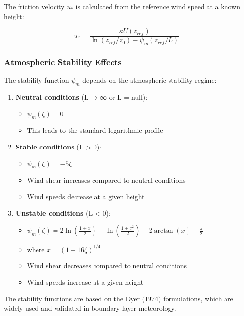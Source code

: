 \documentclass{article}
\begin{document}
The friction velocity \(u_*\) is calculated from the reference wind
speed at a known height:

\[u_* = \frac{\kappa U(z_{ref})}{\ln(z_{ref}/z_0) - \psi_m(z_{ref}/L)}\]

\hypertarget{atmospheric-stability-effects}{%
\subsubsection{Atmospheric Stability
Effects}\label{atmospheric-stability-effects}}

The stability function \(\psi_m\) depends on the atmospheric stability
regime:

\begin{enumerate}[label=\arabic*.]
\item
  \textbf{Neutral conditions} (L → ∞ or L = null):

  \begin{itemize}[label=\textbullet]
  \item
    \(\psi_m(\zeta) = 0\)
  \item
    This leads to the standard logarithmic profile
  \end{itemize}
\item
  \textbf{Stable conditions} (L \textgreater{} 0):

  \begin{itemize}[label=\textbullet]
  \item
    \(\psi_m(\zeta) = -5\zeta\)
  \item
    Wind shear increases compared to neutral conditions
  \item
    Wind speeds decrease at a given height
  \end{itemize}
\item
  \textbf{Unstable conditions} (L \textless{} 0):

  \begin{itemize}[label=\textbullet]
  \item
    \(\psi_m(\zeta) = 2\ln\left(\frac{1+x}{2}\right) + \ln\left(\frac{1+x^2}{2}\right) - 2\arctan(x) + \frac{\pi}{2}\)
  \item
    where \(x = (1-16\zeta)^{1/4}\)
  \item
    Wind shear decreases compared to neutral conditions
  \item
    Wind speeds increase at a given height
  \end{itemize}
\end{enumerate}

The stability functions are based on the Dyer (1974) formulations, which
are widely used and validated in boundary layer meteorology.
\end{document}
